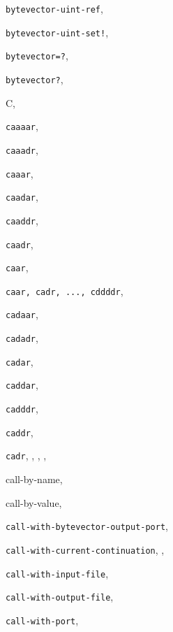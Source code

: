 {\begin{multicols}{2}
\texttt{bytevector-uint-ref}, \textit{\pageref{objects_s258}}
  
\texttt{bytevector-uint-set!}, \textit{\pageref{objects_s259}}
  
\texttt{bytevector=?}, \textit{\pageref{objects_s244}}
  
\texttt{bytevector?}, \textit{\pageref{objects_s24}}
  
C, \pageref{examples_s23}
  
\texttt{caaaar}, \textit{\pageref{objects_s42}}
  
\texttt{caaadr}, \textit{\pageref{objects_s42}}
  
\texttt{caaar}, \textit{\pageref{objects_s42}}
  
\texttt{caadar}, \textit{\pageref{objects_s42}}
  
\texttt{caaddr}, \textit{\pageref{objects_s42}}
  
\texttt{caadr}, \textit{\pageref{objects_s42}}
  
\texttt{caar}, \textit{\pageref{objects_s42}}
  
\texttt{caar, cadr, ..., cddddr}, \pageref{start_s97}
  
\texttt{cadaar}, \textit{\pageref{objects_s42}}
  
\texttt{cadadr}, \textit{\pageref{objects_s42}}
  
\texttt{cadar}, \textit{\pageref{objects_s42}}
  
\texttt{caddar}, \textit{\pageref{objects_s42}}
  
\texttt{cadddr}, \textit{\pageref{objects_s42}}
  
\texttt{caddr}, \textit{\pageref{objects_s42}}
  
\texttt{cadr}, \pageref{start_s83}, \pageref{start_s85}, \pageref{start_s93}, \textit{\pageref{objects_s42}}
  
call-by-name, \pageref{examples_s58}
  
call-by-value, \pageref{examples_s57}
  
\texttt{call-with-bytevector-output-port}, \textit{\pageref{io_s38}}
  
\texttt{call-with-current-continuation}, \textit{\pageref{control_s54}}, \pageref{examples_s99}
  
\texttt{call-with-input-file}, \textit{\pageref{io_s77}}
  
\texttt{call-with-output-file}, \textit{\pageref{io_s78}}
  
\texttt{call-with-port}, \textit{\pageref{io_s51}}
  

\end{multicols}}
